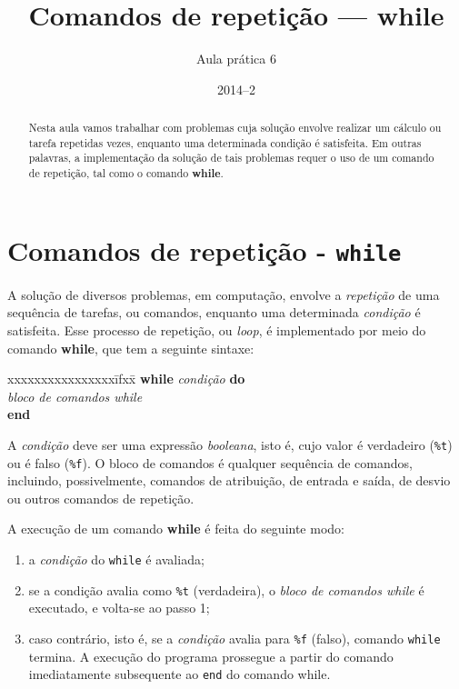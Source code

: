\documentclass[11pt,fleqn]{practice}
\begin{document}
\subtitle{Aula prática 6}
\title{Comandos de repetição --- \textbf{while}}
\author{}
\date{2014--2}
\maketitle

\begin{abstract}
Nesta aula vamos trabalhar com problemas cuja solução envolve realizar 
um cálculo ou tarefa repetidas vezes, enquanto uma determinada
condição é satisfeita. Em outras palavras, a implementação da solução
de tais problemas requer o uso de um comando de repetição, tal como o
comando \textbf{while}.
\end{abstract}

\tableofcontents

\section{Comandos de repetição - \texttt{while}}

A solução de diversos problemas, em computação, envolve a
\emph{repetição\/} de uma sequência de tarefas, ou comandos, enquanto
uma determinada \emph{condição\/} é satisfeita. Esse processo de
repetição, ou \emph{loop}, é implementado por meio do comando
\textbf{while}, que tem a seguinte sintaxe:

\begin{tabbing} xxxxxxxxxxxxxxxx\=ifxx\= \+\kill
      \textbf{while}  \emph{condição}  \textbf{do}\\
	   \>\emph{bloco de comandos  while} \\
     \textbf{end}
\end{tabbing}

A \emph{condição} deve ser uma expressão \emph{booleana}, isto é, cujo 
valor é verdadeiro (\texttt{\%t}) ou é falso (\texttt{\%f}). O bloco
de comandos é qualquer sequência de comandos, incluindo,
possivelmente, comandos de atribuição, de entrada e saída, de desvio
ou outros comandos de repetição.

A execução de um comando \textbf{while} é feita do seguinte modo: 
\begin{enumerate}
\item a \emph{condição\/} do \texttt{while} é avaliada; 
\item se a condição avalia como \texttt{\%t} (verdadeira), o
\emph{bloco de comandos while\/} é executado, e volta-se ao passo 1;
\item caso contrário, isto é, se a \emph{condição\/} avalia para
\texttt{\%f} (falso), comando \texttt{while} termina. A execução do
programa prossegue a partir do comando imediatamente subsequente ao
\texttt{end} do comando while.
\end{enumerate}
\end{document}
